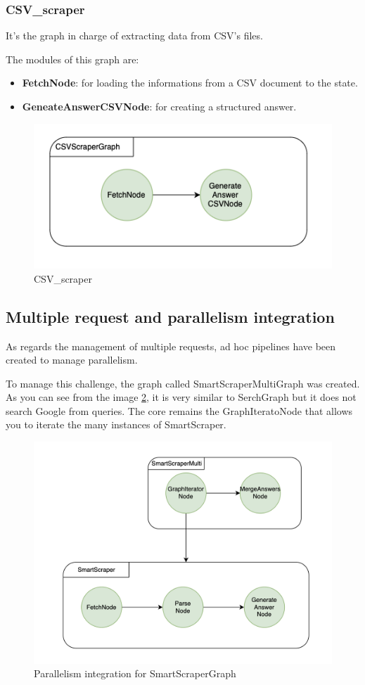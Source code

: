 \subsubsection{CSV\_scraper}
It's the graph in charge of extracting data from CSV's files.

The modules of this graph are: 
\begin{itemize}
    \item \textbf{FetchNode}: for loading the informations from a CSV document to the state.
    \item \textbf{GeneateAnswerCSVNode}: for creating a structured answer.
\end{itemize}

\begin{figure}[h!]
    \centering
    \includegraphics[width=0.75\linewidth]{Assets/csv_scraper.png}
    \caption{CSV\_scraper}
    \label{fig:csv-scraper}
\end{figure}
\subsection{Multiple request and parallelism integration}
As regards the management of multiple requests, ad hoc pipelines have been created to manage parallelism.

To manage this challenge, the graph called SmartScraperMultiGraph was created.
As you can see from the image \ref{fig:multi}, it is very similar to SerchGraph but it does not search Google from queries.
The core remains the GraphIteratoNode that allows you to iterate the many instances of SmartScraper.
\begin{figure}[h!]
    \centering
    \includegraphics[width=0.75\linewidth]{Assets/multi_graph.png}
    \caption{Parallelism integration for SmartScraperGraph}
    \label{fig:multi}
\end{figure}


